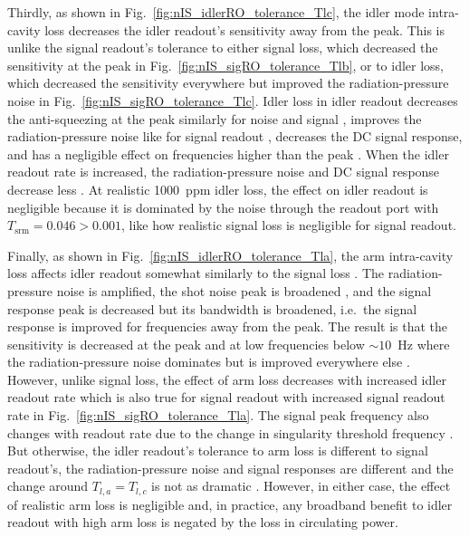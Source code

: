Thirdly, as shown in Fig.~\ref{fig:nIS_idlerRO_tolerance_Tlc}, the idler mode intra-cavity loss decreases the idler readout's sensitivity away from the peak. This is unlike the signal readout's tolerance to either signal loss, which decreased the sensitivity at the peak in Fig.~\ref{fig:nIS_sigRO_tolerance_Tlb}, or to idler loss, which decreased the sensitivity everywhere but improved the radiation-pressure noise in Fig.~\ref{fig:nIS_sigRO_tolerance_Tlc}. Idler loss in idler readout decreases the anti-squeezing at the peak similarly for noise and signal , improves the radiation-pressure noise like for signal readout , decreases the DC signal response, and has a negligible effect on frequencies higher than the peak . When the idler readout rate is increased, the radiation-pressure noise and DC signal response decrease less . At realistic 1000~ppm idler loss, the effect on idler readout is negligible because it is dominated by the noise through the readout port with $T_\text{srm}=0.046>0.001$, like how realistic signal loss is negligible for signal readout.

Finally, as shown in Fig.~\ref{fig:nIS_idlerRO_tolerance_Tla}, the arm intra-cavity loss affects idler readout somewhat similarly to the signal loss . The radiation-pressure noise is amplified, the shot noise peak is broadened , and the signal response peak is decreased but its bandwidth is broadened, i.e.\ the signal response is improved for frequencies away from the peak. The result is that the sensitivity is decreased at the peak and at low frequencies below $\sim10$~Hz where the radiation-pressure noise dominates but is improved everywhere else . However, unlike signal loss, the effect of arm loss decreases with increased idler readout rate  which is also true for signal readout with increased signal readout rate in Fig.~\ref{fig:nIS_sigRO_tolerance_Tla}. The signal peak frequency also changes with readout rate due to the change in singularity threshold frequency . But otherwise, the idler readout's tolerance to arm loss is different to signal readout's, the radiation-pressure noise and signal responses are different and the change around $T_{l,a}=T_{l,c}$ is not as dramatic . However, in either case, the effect of realistic arm loss is negligible  and, in practice, any broadband benefit to idler readout with high arm loss is negated by the loss in circulating power. %

